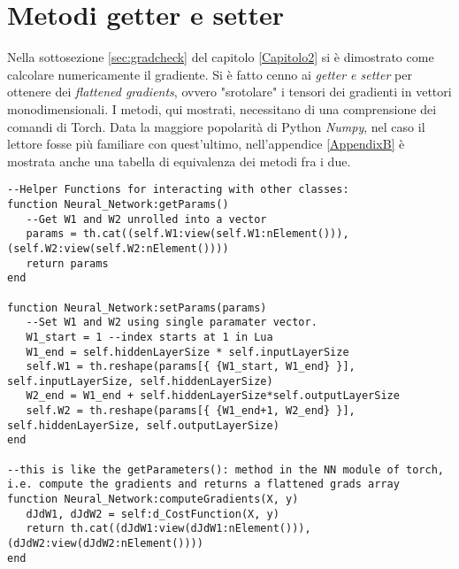 \section{Metodi getter e setter}
Nella sottosezione \ref{sec:gradcheck} del capitolo \ref{Capitolo2} si è dimostrato come calcolare numericamente il gradiente. Si è fatto cenno ai \emph{getter e setter} per ottenere dei \emph{flattened gradients}, ovvero "srotolare" i tensori dei gradienti in vettori monodimensionali. I metodi, qui mostrati, necessitano di una comprensione dei comandi di Torch. Data la maggiore popolarità di Python \emph{Numpy}, nel caso il lettore fosse più familiare con quest'ultimo, nell'appendice \ref{AppendixB} è mostrata anche una tabella di equivalenza dei metodi fra i due. 
\begin{lstlisting}[language={[5.2]Lua}]
--Helper Functions for interacting with other classes:
function Neural_Network:getParams()
   --Get W1 and W2 unrolled into a vector
   params = th.cat((self.W1:view(self.W1:nElement())), (self.W2:view(self.W2:nElement())))
   return params
end

function Neural_Network:setParams(params)
   --Set W1 and W2 using single paramater vector.
   W1_start = 1 --index starts at 1 in Lua
   W1_end = self.hiddenLayerSize * self.inputLayerSize
   self.W1 = th.reshape(params[{ {W1_start, W1_end} }], self.inputLayerSize, self.hiddenLayerSize)
   W2_end = W1_end + self.hiddenLayerSize*self.outputLayerSize
   self.W2 = th.reshape(params[{ {W1_end+1, W2_end} }], self.hiddenLayerSize, self.outputLayerSize)
end

--this is like the getParameters(): method in the NN module of torch, i.e. compute the gradients and returns a flattened grads array
function Neural_Network:computeGradients(X, y)
   dJdW1, dJdW2 = self:d_CostFunction(X, y)
   return th.cat((dJdW1:view(dJdW1:nElement())), (dJdW2:view(dJdW2:nElement())))
end
\end{lstlisting}
